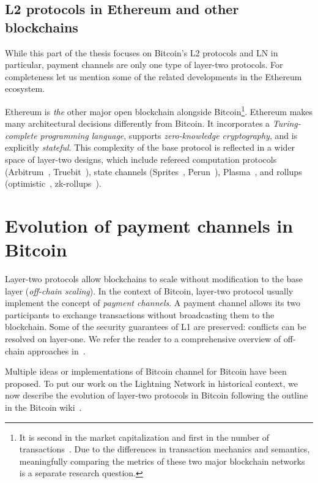 \subsection{L2 protocols in Ethereum and other blockchains}

While this part of the thesis focuses on Bitcoin's L2 protocols and LN in particular, payment channels are only one type of layer-two protocols.
For completeness let us mention some of the related developments in the Ethereum ecosystem.

Ethereum is \textit{the} other major open blockchain alongside Bitcoin\footnote{It is second in the market capitalization and first in the number of transactions~\cite{Coinmetrics}. Due to the differences in transaction mechanics and semantics, meaningfully comparing the metrics of these two major blockchain networks is a separate research question.}.
Ethereum makes many architectural decisions differently from Bitcoin.
It incorporates a \textit{Turing-complete programming language}, supports \textit{zero-knowledge cryptography}, and is explicitly \textit{stateful}.
This complexity of the base protocol is reflected in a wider space of layer-two designs, which include refereed computation protocols (Arbitrum~\cite{Kalodner2018}, Truebit~\cite{Teutsch2017}), state channels (Sprites~\cite{Miller2019}, Perun~\cite{Dziembowski2017}), Plasma~\cite{Poon2017}, and rollups (optimistic~\cite{Floersch2019}, zk-rollups~\cite{Gluchowski2019}).


\section{Evolution of payment channels in Bitcoin}

Layer-two protocols allow blockchains to scale without modification to the base layer (\textit{off-chain scaling}).
In the context of Bitcoin, layer-two protocol usually implement the concept of \textit{payment channels}.
A payment channel allows its two participants to exchange transactions without broadcasting them to the blockchain.
Some of the security guarantees of L1 are preserved: conflicts can be resolved on layer-one.
We refer the reader to a comprehensive overview of off-chain approaches in~\cite{Gudgeon2019}.

Multiple ideas or implementations of Bitcoin channel for Bitcoin have been proposed.
To put our work on the Lightning Network in historical context, we now describe the evolution of layer-two protocols in Bitcoin following the outline in the Bitcoin wiki~\cite{BitcoinWikiChannels}.

